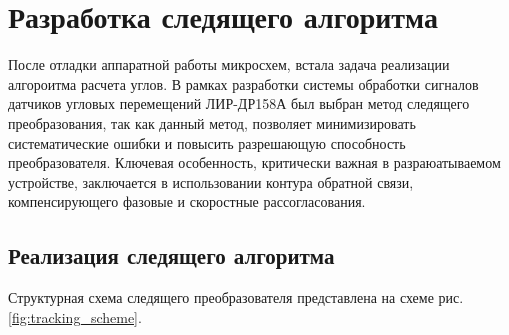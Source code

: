 \section{Разработка следящего алгоритма}
После отладки аппаратной работы микросхем, встала задача реализации алгороитма расчета углов. 
В рамках разработки системы обработки сигналов датчиков угловых перемещений ЛИР-ДР158А был выбран метод следящего преобразования, так как данный метод,
 позволяет минимизировать систематические ошибки и повысить разрешающую способность преобразователя. 
 Ключевая особенность, критически важная в разраюатываемом устройстве, заключается в использовании контура обратной связи, компенсирующего фазовые и скоростные рассогласования.

\subsection{Реализация следящего алгоритма}
Структурная схема следящего преобразователя представлена на схеме рис. \ref{fig:tracking_scheme}. 

